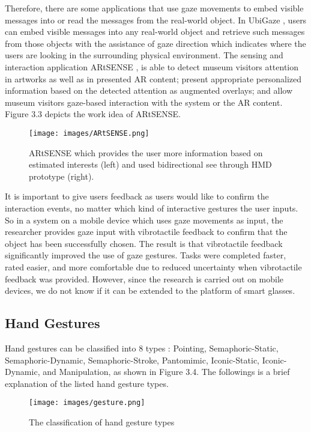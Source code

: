\documentclass[fyp]{socreport}
\begin{document}
Therefore, there are some applications that use gaze movements to embed visible messages into or read the messages from the real-world object. In UbiGaze \cite{bace2016ubigaze}, users can embed visible messages into any real-world object and retrieve such messages from those objects with the assistance of gaze direction which indicates where the users are looking in the surrounding physical environment. The sensing and interaction application ARtSENSE \cite{schuchert2012sensing}, is able to detect museum visitors attention in artworks as well as in presented AR content; present appropriate personalized information based on the detected attention as augmented overlays; and allow museum visitors gaze-based interaction with the system or the AR content. Figure 3.3 depicts the work idea of ARtSENSE.

\begin{figure}[H]
\caption{ARtSENSE which provides the user more information based on estimated interests (left) and used bidirectional see through HMD prototype (right).}
\centering
\texttt{[image: images/ARtSENSE.png]}
\end{figure}

It is important to give users feedback as users would like to confirm the interaction events, no matter which kind of interactive gestures the user inputs. So in a system on a mobile device which uses gaze movements as input, the researcher \cite{kangas2014gaze} provides gaze input with vibrotactile feedback to confirm that the object has been successfully chosen. The result is that vibrotactile feedback significantly improved the use of gaze gestures. Tasks were completed faster, rated easier, and more comfortable due to reduced uncertainty when vibrotactile feedback was provided. However, since the research is carried out on mobile devices, we do not know if it can be extended to the platform of smart glasses.

\subsection{Hand Gestures}
Hand gestures can be classified into 8 types \cite{aigner2012understanding}: Pointing, Semaphoric-Static, Semaphoric-Dynamic, Semaphoric-Stroke, Pantomimic, Iconic-Static, Iconic-Dynamic, and Manipulation, as shown in Figure 3.4. The followings is a brief explanation of the listed hand gesture types.

\begin{figure}[H]
\centering
\caption{The classification of hand gesture types}
\cite{aigner2012understanding}

\texttt{[image: images/gesture.png]}
\centering
\end{figure}
\end{document}
